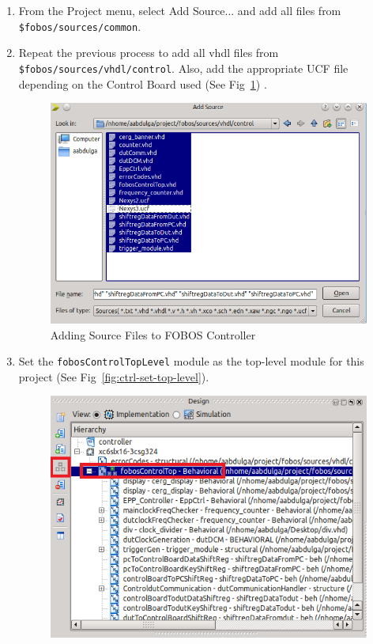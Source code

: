 \begin{enumerate}
\begin{figure}[H]
		\vspace{-1ex}
		\end{figure}
  \item From the Project menu, select Add Source... and add all files from \texttt{\$fobos/sources/common}.
  \item Repeat the previous process to add all vhdl files from \texttt{\$fobos/sources/vhdl/control}. Also, add the appropriate UCF file depending on the Control Board used (See Fig~\ref{fig:ctrl-add-sources}) .
		\begin{figure}[H]
		\begin{center}
		\includegraphics[scale=0.6]{figures/ctrl-add-sources}
		\caption{\label{fig:ctrl-add-sources}Adding Source Files to FOBOS Controller}
		\end{center} 
		\vspace{-1ex}
		\end{figure}
  \item Set the \texttt{fobosControlTopLevel} module as the top-level module for this project (See Fig~\ref{fig:ctrl-set-top-level}).
		\begin{figure}[H]
		\begin{center}
		\includegraphics[scale=0.6]{figures/ctrl-set-top-level}

\end{center}
\end{figure}
\end{enumerate}

